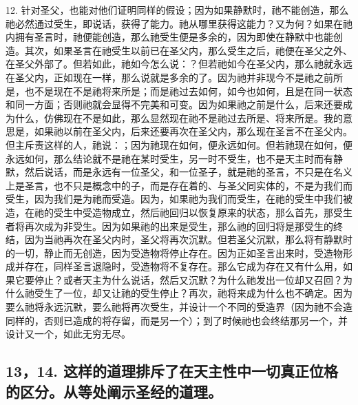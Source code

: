 12. 针对圣父，也能对他们证明同样的假设；因为如果静默时，祂不能创造，那么祂必然通过受生，即说话，获得了能力。祂从哪里获得这能力？又为何？如果在祂内拥有圣言时，祂便能创造，那么祂受生便是多余的，因为即使在静默中也能创造。其次，如果圣言在祂受生以前已在圣父内，那么受生之后，祂便在圣父之外、在圣父外部了。但若如此，祂如今怎么说：？但若祂如今在圣父内，那么祂就永远在圣父内，正如现在一样，那么说就是多余的了。因为祂并非现今不是祂之前所是，也不是现在不是祂将来所是；而是祂过去如何，如今也如何，且是在同一状态和同一方面；否则祂就会显得不完美和可变。因为如果祂之前是什么，后来还要成为什么，仿佛现在不是如此，那么显然现在祂不是祂过去所是、将来所是。我的意思是，如果祂以前在圣父内，后来还要再次在圣父内，那么现在圣言不在圣父内。但主斥责这样的人，祂说：；因为祂现在如何，便永远如何。但若祂现在如何，便永远如何，那么结论就不是祂在某时受生，另一时不受生，也不是天主时而有静默，然后说话，而是永远有一位圣父，和一位圣子，就是祂的圣言，不只是在名义上是圣言，也不只是概念中的子，而是存在着的、与圣父同实体的，不是为我们而受生，因为我们是为祂而受造。因为，如果祂为我们而受生，在祂的受生中我们被造，在祂的受生中受造物成立，然后祂回归以恢复原来的状态，那么首先，那受生者将再次成为非受生。因为如果祂的出来是受生，那么祂的回归将是那受生的终结，因为当祂再次在圣父内时，圣父将再次沉默。但若圣父沉默，那么将有静默时的一切，静止而无创造，因为受造物将停止存在。因为正如圣言出来时，受造物形成并存在，同样圣言退隐时，受造物将不复存在。那么它成为存在又有什么用，如果它要停止？或者天主为什么说话，然后又沉默？为什么祂发出一位却又召回？为什么祂受生了一位，却又让祂的受生停止？再次，祂将来成为什么也不确定。因为要么祂将永远沉默，要么祂将再次受生，并设计一个不同的受造界（因为祂不会造同样的，否则已造成的将存留，而是另一个）；到了时候祂也会终结那另一个，并设计又一个，如此无穷无尽。\par


\subsection{13，14. 这样的道理排斥了在天主性中一切真正位格的区分。从等处阐示圣经的道理。}

